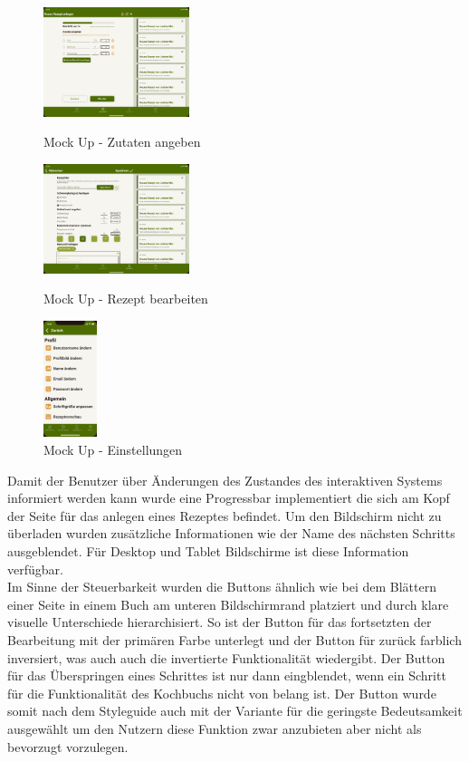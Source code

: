\begin{figure}
    \centering
        \includegraphics[width=0.38\textwidth]{images/addingredient.png}
    \caption[Mock Up - Zutaten angeben]{Mock Up - Zutaten angeben}
\label{fig:mockup-addingredient}
    \centering
        \includegraphics[width=0.38\textwidth]{images/editrecipe.png}
    \caption[Mock Up - Rezept bearbeiten]{Mock Up - Rezept bearbeiten}
\label{fig:mockup-editrecipe}
    \centering
        \includegraphics[width=0.14\textwidth]{images/settings.jpg}
    \caption[Mock Up - Einstellungen]{Mock Up - Einstellungen}
\label{fig:mockup-settings}
\end{figure}
Damit der Benutzer über Änderungen des Zustandes des interaktiven Systems informiert werden kann wurde eine Progressbar implementiert die sich am Kopf der Seite für das anlegen eines Rezeptes befindet. Um den Bildschirm nicht zu überladen wurden zusätzliche Informationen wie der Name des nächsten Schritts ausgeblendet. Für Desktop und Tablet Bildschirme ist diese Information verfügbar. \\
 Im Sinne der Steuerbarkeit wurden die Buttons ähnlich wie bei dem Blättern einer Seite in einem Buch am unteren Bildschirmrand platziert und durch klare visuelle Unterschiede hierarchisiert. So ist der Button für das fortsetzten der Bearbeitung mit der primären Farbe unterlegt und der Button für zurück farblich inversiert, was auch auch die invertierte Funktionalität wiedergibt. Der Button für das Überspringen eines Schrittes ist nur dann eingblendet, wenn ein Schritt für die Funktionalität des Kochbuchs nicht von belang ist. Der Button wurde somit nach dem Styleguide auch mit der Variante für die geringste Bedeutsamkeit ausgewählt um den Nutzern diese Funktion zwar anzubieten aber nicht als bevorzugt vorzulegen. \\

